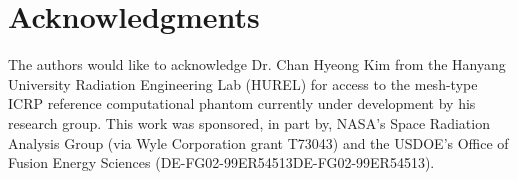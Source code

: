 \documentclass{anstrans}
\begin{document}
\section{Acknowledgments}

The authors would like to acknowledge Dr. Chan Hyeong Kim from the Hanyang University Radiation Engineering Lab (HUREL)
for access to the mesh-type ICRP reference computational phantom currently under development by his research group.
This work was sponsored, in part by, NASA's Space Radiation Analysis Group (via Wyle Corporation grant T73043)
and the USDOE's Office of Fusion Energy Sciences (DE-FG02-99ER54513DE-FG02-99ER54513).



\end{document}
